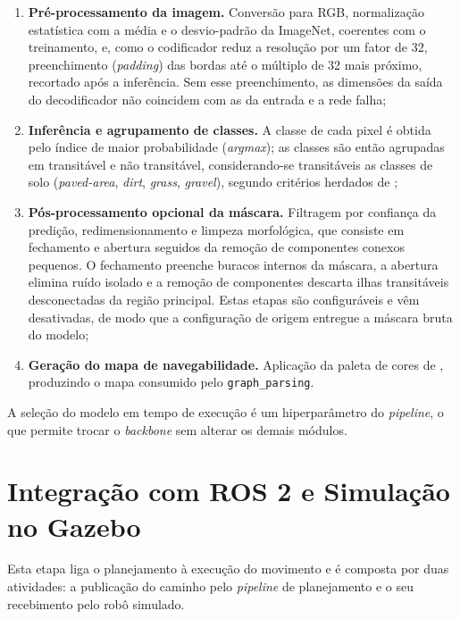 \documentclass[
    12pt,
    openright,
    oneside,
    a4paper,
    english,
    brazil
]{abntex2}
\begin{document}
\begin{enumerate}
    \item \textbf{Pré-processamento da imagem.} Conversão para RGB, normalização estatística com a média e o desvio-padrão da ImageNet, coerentes com o treinamento, e, como o codificador reduz a resolução por um fator de 32, preenchimento (\textit{padding}) das bordas até o múltiplo de 32 mais próximo, recortado após a inferência. Sem esse preenchimento, as dimensões da saída do decodificador não coincidem com as da entrada e a rede falha;
    \item \textbf{Inferência e agrupamento de classes.} A classe de cada pixel é obtida pelo índice de maior probabilidade (\textit{argmax}); as classes são então agrupadas em transitável e não transitável, considerando-se transitáveis as classes de solo (\textit{paved-area}, \textit{dirt}, \textit{grass}, \textit{gravel}), segundo critérios herdados de \cite{junior2024};
    \item \textbf{Pós-processamento opcional da máscara.} Filtragem por confiança da predição, redimensionamento e limpeza morfológica, que consiste em fechamento e abertura seguidos da remoção de componentes conexos pequenos. O fechamento preenche buracos internos da máscara, a abertura elimina ruído isolado e a remoção de componentes descarta ilhas transitáveis desconectadas da região principal. Estas etapas são configuráveis e vêm desativadas, de modo que a configuração de origem entregue a máscara bruta do modelo;
    \item \textbf{Geração do mapa de navegabilidade.} Aplicação da paleta de cores de \cite{junior2025_rrt}, produzindo o mapa consumido pelo \texttt{graph\_\allowbreak{}parsing}.
\end{enumerate}

A seleção do modelo em tempo de execução é um hiperparâmetro do \textit{pipeline}, o que permite trocar o \textit{backbone} sem alterar os demais módulos.

\section{Integração com ROS 2 e Simulação no Gazebo}
\label{sec:ros_integracao}

Esta etapa liga o planejamento à execução do movimento e é composta por duas atividades: a publicação do caminho pelo \textit{pipeline} de planejamento e o seu recebimento pelo robô simulado.
\end{document}
